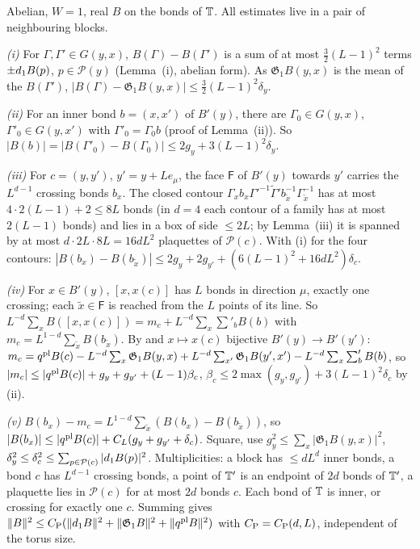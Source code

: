 \begin{detail}\label{d7:poinc}
Abelian, $W=1$, real $B$ on the bonds of $\mathbb T$. All estimates live in a pair of neighbouring blocks.
\begin{step}
\emph{(i)} For $\Gamma,\Gamma'\in G(y,x)$, $B(\Gamma)-B(\Gamma')$ is a sum of at most $\frac32(L-1)^2$ terms $\pm d_1 B(p)$, $p\in\mathcal P(y)$ (Lemma~(i), abelian form). As $\mathfrak G_1B(y,x)$ is the mean of the $B(\Gamma')$, $|B(\Gamma)-\mathfrak G_1B(y,x)|\le\frac32(L-1)^2\delta_y$.
\end{step}
\begin{step}
\emph{(ii)} For an inner bond $b=(x,x')$ of $B'(y)$, there are $\Gamma_0\in G(y,x)$, $\Gamma'_0\in G(y,x')$ with $\Gamma'_0=\Gamma_0b$ (proof of Lemma~(ii)). So $|B(b)|=|B(\Gamma'_0)-B(\Gamma_0)|\le2g_y+3(L-1)^2\delta_y$.
\end{step}
\begin{step}
\emph{(iii)} For $c=(y,y')$, $y'=y+Le_\mu$, the face $\mathsf F$ of $B'(y)$ towards $y'$ carries the $L^{d-1}$ crossing bonds $b_x$. The closed contour $\Gamma_xb_x\Gamma'^{-1}\tilde\Gamma'b_{\tilde x}^{-1}\Gamma_{\tilde x}^{-1}$ has at most $4\cdot2(L-1)+2\le8L$ bonds (in $d=4$ each contour of a family has at most $2(L-1)$ bonds) and lies in a box of side $\le2L$; by Lemma~(iii) it is spanned by at most $d\cdot2L\cdot8L=16dL^2$ plaquettes of $\mathcal P(c)$. With (i) for the four contours: $|B(b_x)-B(b_{\tilde x})|\le2g_y+2g_{y'}+(6(L-1)^2+16dL^2)\delta_c$.
\end{step}
\begin{step}
\emph{(iv)} For $x\in B'(y)$, $[x,x(c)]$ has $L$ bonds in direction $\mu$, exactly one crossing; each $\tilde x\in\mathsf F$ is reached from the $L$ points of its line. So $L^{-d}\sum_xB([x,x(c)])=m_c+L^{-d}\sum_x\sum'_bB(b)$ with $m_c=L^{1-d}\sum_{\tilde x}B(b_{\tilde x})$. By  and $x\mapsto x(c)$ bijective $B'(y)\to B'(y')$: $m_c=q^{\rm pl}B(c)-L^{-d}\sum_x\mathfrak G_1B(y,x)+L^{-d}\sum_{x'}\mathfrak G_1B(y',x')-L^{-d}\sum_x\sum'_bB(b)$, so $|m_c|\le|q^{\rm pl}B(c)|+g_y+g_{y'}+(L-1)\beta_c$, $\beta_c\le2\max(g_y,g_{y'})+3(L-1)^2\delta_c$ by (ii).
\end{step}
\begin{step}
\emph{(v)} $B(b_x)-m_c=L^{1-d}\sum_{\tilde x}(B(b_x)-B(b_{\tilde x}))$, so $|B(b_x)|\le|q^{\rm pl}B(c)|+C_L(g_y+g_{y'}+\delta_c)$. Square, use $g_y^2\le\sum_x|\mathfrak G_1B(y,x)|^2$, $\delta_y^2\le\delta_c^2\le\sum_{p\in\mathcal P(c)}|d_1 B(p)|^2$. Multiplicities: a block has $\le dL^d$ inner bonds, a bond $c$ has $L^{d-1}$ crossing bonds, a point of $\mathbb T'$ is an endpoint of $2d$ bonds of $\mathbb T'$, a plaquette lies in $\mathcal P(c)$ for at most $2d$ bonds $c$. Each bond of $\mathbb T$ is inner, or crossing for exactly one $c$. Summing gives $\|B\|^2\le C_{\rm P}(\|d_1 B\|^2+\|\mathfrak G_1B\|^2+\|q^{\rm pl}B\|^2)$ with $C_{\rm P}=C_{\rm P}(d,L)$, independent of the torus size.
\end{step}
\end{detail}

